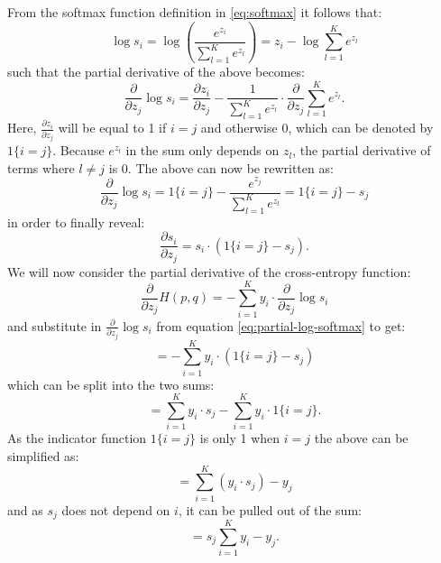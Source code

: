 \documentclass[a4paper,11pt]{article} %
\begin{document}
From the softmax function definition in \ref{eq:softmax} it follows that:
\begin{equation}
  \log s_i = \log \left( \frac{e^{z_i}}{\sum_{l=1}^{K}{e^{z_l}}}  \right) = z_i - \log  \sum_{l=1}^{K}{e^{z_l}}
\end{equation}
such that the partial derivative of the above becomes:
\begin{equation}
  \frac{\partial}{\partial z_j} \log s_i = \frac{\partial z_i}{\partial z_j} - \frac{1}{\sum_{l=1}^{K}{e^{z_l}}} \cdot \frac{\partial}{\partial z_j} \sum_{l=1}^{K}{ e^{z_l}}.
\end{equation}
Here, $\frac{\partial z_i}{\partial z_j}$ will be equal to 1 if $i=j$ and otherwise 0, which can be denoted by $1\{i = j\}$. Because $e^{z_l}$ in the sum only depends on $z_l$, the partial derivative of terms where $l\neq j$ is 0. The above can now be rewritten as:
\begin{equation} \label{eq:partial-log-softmax}
  \frac{\partial}{\partial z_j} \log s_i = 1\{ i = j \} - \frac{e^{z_j}}{\sum_{l=1}^{K}{ e^{z_l}}} = 1\{ i = j \} - s_j
\end{equation}
in order to finally reveal:
\begin{equation}
  \frac{\partial s_i}{\partial z_j} = s_i \cdot \left( 1\{ i = j \} - s_j \right).
\end{equation}
We will now consider the partial derivative of the cross-entropy function:
\begin{equation}
  \frac{\partial}{\partial z_j} H(p, q) = - \sum_{i=1}^{K} y_{i} \cdot \frac{\partial}{\partial z_j} \log s_i
\end{equation}
and substitute in $\frac{\partial}{\partial z_j} \log s_i$ from equation \ref{eq:partial-log-softmax} to get:
\begin{equation}
  = - \sum_{i=1}^{K} y_{i} \cdot \left( 1\{ i = j \} - s_j \right)
\end{equation}
which can be split into the two sums:
\begin{equation}
  = \sum_{i=1}^{K}{y_{i} \cdot s_j} - \sum_{i=1}^{K}{y_{i} \cdot 1\{ i = j \}}.
\end{equation}
As the indicator function $1\{i=j\}$ is only 1 when $i=j$ the above can be simplified as:
\begin{equation}
  = \sum_{i=1}^{K}{\left( y_{i} \cdot s_j \right)} - y_{j}
\end{equation}
and as $s_j$ does not depend on $i$, it can be pulled out of the sum:
\begin{equation}
  = s_j \sum_{i=1}^{K}{ y_{i} } - y_{j}.
\end{equation}
\end{document}
